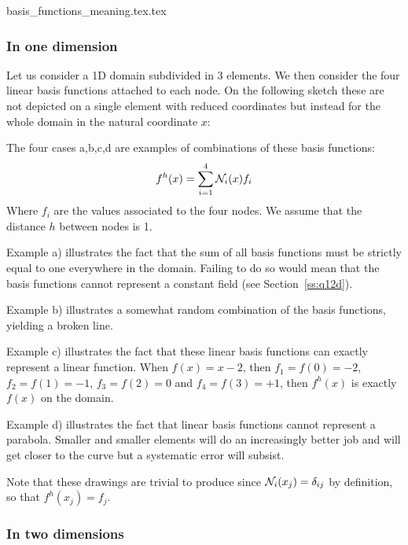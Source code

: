 \begin{flushright} {\tiny {\color{gray} basis\_functions\_meaning.tex.tex}} \end{flushright}


\subsubsection{In one dimension}

Let us consider a 1D domain subdivided in 3 elements. We then consider the four linear basis functions 
attached to each node. On the following sketch these are not depicted on a single element with 
reduced coordinates but instead for the whole domain in the natural coordinate $x$:



The four cases a,b,c,d are examples of combinations of these basis functions:
\[
f^h(x)=\sum_{i=1}^4 {\mathcal{N}}_i(x) f_i
\]
Where $f_i$ are the values associated to the four nodes. 
We assume that the distance $h$ between nodes is 1.

Example a) illustrates the fact that the sum of all basis functions must be strictly equal to one everywhere
in the domain. Failing to do so would mean that the basis functions cannot represent a constant field (see
Section~\ref{ss:q12d}). 

Example b) illustrates a somewhat random combination of the basis functions, yielding a broken line. 

Example c) illustrates the fact that these linear basis functions can exactly represent a
linear function. When $f(x)=x-2$, then $f_1=f(0)=-2$, $f_2=f(1)=-1$, $f_3=f(2)=0$ and $f_4=f(3)=+1$, 
then $f^h(x)$ is exactly $f(x)$ on the domain.

Example d) illustrates the fact that linear basis functions cannot represent a parabola. Smaller and 
smaller elements will do an increasingly better job and will get closer to the curve but a 
systematic error will subsist.  


Note that these drawings are trivial to produce since ${\mathcal{N}}_i(x_j)=\delta_{ij}$ by definition, so that 
$f^h(x_j)=f_j$.

\subsubsection{In two dimensions}



